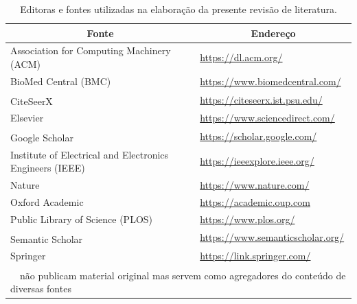 \documentclass[english,brazilian]{UNISINOSmonografia} %
\newcommand\defaultFigureWidth{0.9}
\begin{document}
\begin{table}[tb]
\centering%
\begin{minipage}{\defaultFigureWidth\textwidth}
	\caption{Editoras e fontes utilizadas na elaboração da presente revisão de literatura.}
	\label{tab:survey-sources}
	\vspace{1ex}
	\renewcommand{\tabularxcolumn}[1]{>{\arraybackslash}m{#1}}
	\begin{tabularx}{\textwidth}{Xl@{}}
		\toprule
		\multicolumn{1}{c}{Fonte} & \multicolumn{1}{c}{Endereço} \\ 
		\midrule
		Association for Computing Machinery (ACM) & \url{https://dl.acm.org/} \\
		BioMed Central (BMC) & \url{https://www.biomedcentral.com/} \\
		CiteSeerX\textsuperscript{~\dag} & \url{https://citeseerx.ist.psu.edu/} \\
		Elsevier & \url{https://www.sciencedirect.com/} \\
		Google Scholar\textsuperscript{~\dag} & \url{https://scholar.google.com/} \\
		Institute of Electrical and Electronics Engineers (IEEE) & \url{https://ieeexplore.ieee.org/} \\
		Nature & \url{https://www.nature.com/} \\
		Oxford Academic & \url{https://academic.oup.com} \\
		Public Library of Science (PLOS) & \url{https://www.plos.org/} \\
		Semantic Scholar\textsuperscript{~\dag} & \url{https://www.semanticscholar.org/} \\
		Springer & \url{https://link.springer.com/} \\
		\bottomrule
		\multicolumn{2}{l}{\scriptsize{\textsuperscript{\dag}~~não publicam material original mas servem como agregadores do conteúdo de diversas fontes}}
	\end{tabularx}
\end{minipage}
\end{table}
\end{document}
